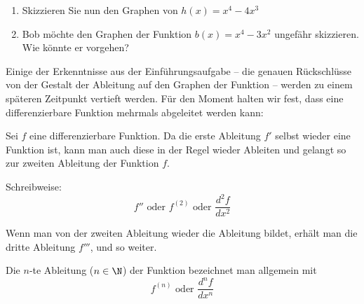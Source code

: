 \begin{enumerate}
\begin{center}
          \end{center}
          \pagebreak

    \item Skizzieren Sie nun den Graphen von $h(x)=x^4-4x^3$

          \begin{center}
          \end{center}
    \item Bob möchte den Graphen der Funktion $b(x)=x^4-3x^2$ ungefähr skizzieren. Wie könnte er vorgehen?
\end{enumerate}
\clearpage
Einige der Erkenntnisse aus der Einführungsaufgabe – die genauen Rückschlüsse von der Gestalt der Ableitung auf den Graphen der Funktion – werden zu einem späteren Zeitpunkt vertieft werden. Für den Moment halten wir fest, dass eine differenzierbare Funktion mehrmals abgeleitet werden kann:
\begin{deff}
    {}
    Sei $f$ eine differenzierbare Funktion. Da die erste Ableitung $f'$ selbst wieder eine Funktion ist, kann man auch diese in der Regel wieder Ableiten und gelangt so zur zweiten Ableitung der Funktion $f$.

    Schreibweise:
    $$f'' \text{ oder } f^{(2) } \text{ oder } \frac{d^2 f}{dx^2 }$$

    Wenn man von der zweiten Ableitung wieder die Ableitung bildet, erhält man die dritte Ableitung $f'''$, und so weiter.

    Die $n$-te Ableitung ($n\in \N$) der Funktion bezeichnet man allgemein mit
    $$f^{(n)} \text{ oder } \frac{d^n f}{dx^n} $$

\end{deff}

